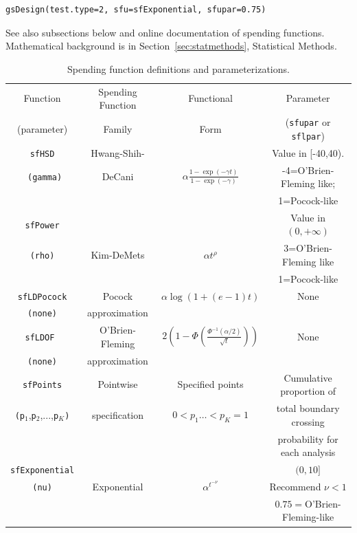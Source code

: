 \bigskip

\begin{verbatim}
gsDesign(test.type=2, sfu=sfExponential, sfupar=0.75)
\end{verbatim}
\bigskip

See also subsections below and online documentation of spending functions.
Mathematical background is in Section~\ref{sec:statmethods}, Statistical Methods.

\bigskip

\begin{table}
\caption{Spending function definitions and parameterizations.}
\begin{tabular}
[c]{cccc}\hline
Function & Spending Function & Functional & Parameter\\
(parameter) & Family & Form & (\texttt{sfupar} or \texttt{sflpar})\\\hline
\texttt{sfHSD} & Hwang-Shih- &  & Value in [-40,40).\\
\texttt{\ (gamma)} & DeCani & $\alpha\frac{1-\exp(-\gamma t)}{1-\exp(-\gamma
)}$ & -4=O'Brien-Fleming like;\\
&  &  & 1=Pocock-like\\\hline
\texttt{sfPower} &  &  & Value in $(0,+\infty)$\\
\texttt{(rho)} & Kim-DeMets & $\alpha t^{\rho}$ & 3=O'Brien-Fleming like\\
&  &  & 1=Pocock-like\\\hline
\texttt{sfLDPocock} & Pocock & $\alpha\log(1+(e-1)t)$ & None\\
\texttt{(none)} & approximation &  & \\\hline
\texttt{sfLDOF } & O'Brien-Fleming & $2\left(  1-\Phi\left(  \frac{\Phi
^{-1}(\alpha/2)}{\sqrt{t}}\right)  \right)  $ & None\\
\texttt{(none)} & approximation &  & \\\hline
\texttt{sfPoints} & Pointwise & Specified points & Cumulative proportion of\\
\texttt{(p}$_{1}$,\texttt{p}$_{2}$,...,\texttt{p}$_{K}$\texttt{)} &
specification & $0<p_{1}\ldots<p_{K}=1$ & total boundary crossing\\
&  &  & probability for each analysis\\\hline
\texttt{sfExponential} &  &  & $(0,10]$\\
\texttt{(nu)} & Exponential & $\alpha^{t^{-\nu}}$ & Recommend $\nu<1$\\
&  &  & $0.75=$O'Brien-Fleming-like\\\hline

\end{tabular}
\end{table}
